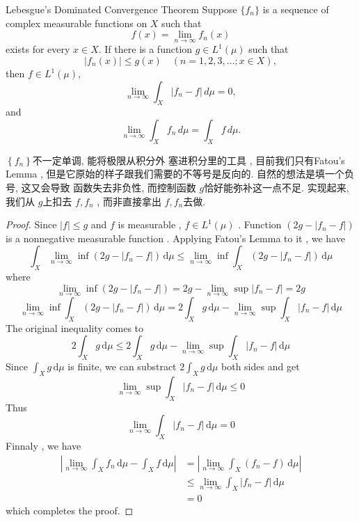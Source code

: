 \documentclass[../main.tex]{subfiles}
\begin{document}
\begin{theorem}{Lebesgue's Dominated Convergence Theorem}{}
Suppose $\{f_n\}$ is a sequence of complex measurable functions on $X$ such that
\[
f(x) = \lim_{n \to \infty} f_n(x)
\]
exists for every $x \in X$. If there is a function $g \in L^1(\mu)$ such that
\[
|f_n(x)| \le g(x) \quad (n = 1, 2, 3, \dots; x \in X),
\]
then $f \in L^1(\mu)$,
\[
\lim_{n \to \infty} \int_X |f_n - f| \, d\mu = 0,
\]
and
\[
\lim_{n \to \infty} \int_X f_n \, d\mu = \int_X f \, d\mu.
\]
\end{theorem}

\begin{proofsketch}
     \( \left\{ f_{n} \right\}  \)不一定单调,  能将极限从积分外 塞进积分里的工具 , 目前我们只有Fatou's Lemma , 但是它原始的样子跟我们需要的不等号是反向的. 自然的想法是填一个负号, 这又会导致 函数失去非负性, 而控制函数 \(  g  \)恰好能弥补这一点不足. 实现起来, 我们从 \(  g  \)上扣去 \(  f,f_{n}  \)    , 而非直接拿出 \(  f, f_{n}  \)去做.  
\end{proofsketch}
\begin{proof}
    Since \(  \left| f \right|\le g   \)  and \(  f   \) is measurable , \(  f \in  L^{1}\left( \mu  \right)    \) .  Function \(  \left( 2g- \left| f_{n}-f \right| \right)    \)   is a  nonnegative measurable function .  Applying Fatou's Lemma to it , we have \[
    \int_{X}\lim_{n\to \infty}\inf \left( 2g-\left| f_{n}-f \right|  \right)\,\mathrm{d} \mu \le \lim_{n\to \infty}\inf \int_{X}\left( 2g-\left| f_{n}-f \right|  \right)\,\mathrm{d} \mu   
    \]where \[
    \lim_{n\to \infty} \inf \left( 2g-\left| f_{n}-f \right|  \right) = 2g- \lim_{n\to \infty}\sup \left| f_{n}-f \right| = 2g
    \] \[
    \lim_{n\to \infty}\inf \int_{X}\left( 2g- \left| f_{n}-f \right|  \right)\,\mathrm{d} \mu =  2\int_{X}g\,\mathrm{d} \mu  - \lim_{n\to \infty}\sup \int_{X}\left| f_{n}-f \right|\,\mathrm{d} \mu   
    \] The original inequality comes to  \[
    2\int_{X}g\,\mathrm{d} \mu \le  2\int_{X}g\,\mathrm{d} \mu - \lim_{n\to \infty}\sup \int_{X}\left| f_{n}-f \right|\,\mathrm{d} \mu  
    \] Since \(  \int_{X}g\,\mathrm{d} \mu   \) is finite, we can substract \(  2\int_{X}g\,\mathrm{d} \mu   \) both sides and get \[
    \lim_{n\to \infty}\sup \int_{X}\left| f_{n}-f \right|\,\mathrm{d} \mu \le 0 
    \]  Thus \[
     \lim_{n\to \infty}\int_{X}\left| f_{n}-f \right|\,\mathrm{d} \mu = 0 
    \]Finnaly , we have\[
 \begin{aligned}
    \left| \lim_{n\to \infty} \int_{X}f_{n}\,\mathrm{d} \mu - \int_{X}f\,\mathrm{d} \mu \right|  &= \left| \lim_{n\to \infty} \int_{X} \left( f_{n}-f \right)\,\mathrm{d} \mu   \right|  \\ 
     &\le  \lim_{n\to \infty} \int_{X}\left| f_{n}-f \right|\,\mathrm{d} \mu \\ 
      &= 0 
 \end{aligned}
    \] which completes the proof. 
\end{proof}
\end{document}
